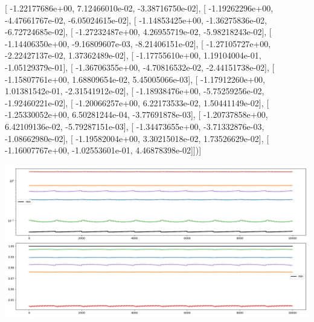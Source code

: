 \documentclass{article}
\begin{document}
       [ -1.22177686e+00,   7.12466010e-02,  -3.38716750e-02],
       [ -1.19262296e+00,  -4.47661767e-02,  -6.05024615e-02],
       [ -1.14853425e+00,  -1.36275836e-02,  -6.72724685e-02],
       [ -1.27232487e+00,   4.26955719e-02,  -5.98218243e-02],
       [ -1.14406350e+00,  -9.16809607e-03,  -8.21406151e-02],
       [ -1.27105727e+00,  -2.22427137e-02,   1.37362489e-02],
       [ -1.17755610e+00,   1.19104004e-01,  -1.05129379e-01],
       [ -1.36706355e+00,  -4.70816532e-02,  -2.44151738e-02],
       [ -1.15807761e+00,   1.68809654e-02,   5.45005066e-03],
       [ -1.17912260e+00,   1.01381542e-01,  -2.31541912e-02],
       [ -1.18938476e+00,  -5.75259256e-02,  -1.92460221e-02],
       [ -1.20066257e+00,   6.22173533e-02,   1.50441149e-02],
       [ -1.25330052e+00,   6.50281244e-04,  -3.77691878e-03],
       [ -1.20737858e+00,   6.42109136e-02,  -5.79287151e-03],
       [ -1.34473655e+00,  -3.71332876e-03,  -1.08662980e-02],
       [ -1.19582004e+00,   3.30215018e-02,   1.73526629e-02],
       [ -1.16007767e+00,  -1.02553601e-01,   4.46878398e-02]])]
\begin{center}
\includegraphics[scale=.9]{report_pickled_controls42/control_dpn_all}

\end{center}
\end{document}
